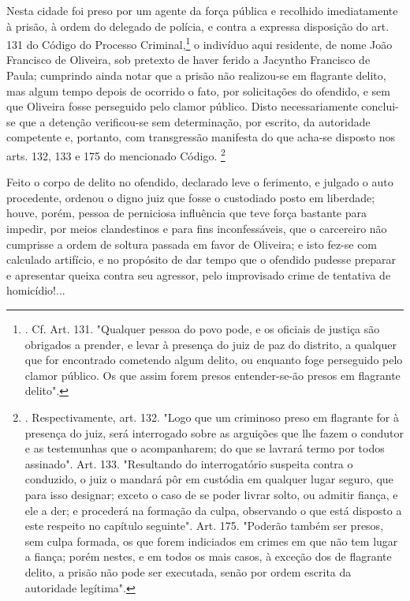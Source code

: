 Nesta cidade foi preso por um agente da força pública e recolhido
imediatamente à prisão, à ordem do delegado de polícia, e contra a
expressa disposição do art. 131 do Código do Processo
Criminal,\footnote{. Cf. Art. 131. "Qualquer pessoa do povo pode, e os
  oficiais de justiça são obrigados a prender, e levar à presença do
  juiz de paz do distrito, a qualquer que for encontrado cometendo algum
  delito, ou enquanto foge perseguido pelo clamor público. Os que assim
  forem presos entender-se-ão presos em flagrante delito".} o indivíduo
aqui residente, de nome João Francisco de Oliveira, sob pretexto de
haver ferido a Jacyntho Francisco de Paula; cumprindo ainda notar que a
prisão não realizou-se em flagrante delito, mas algum tempo depois de
ocorrido o fato, por solicitações do ofendido, e sem que Oliveira fosse
perseguido pelo clamor público. Disto necessariamente conclui-se que a
detenção verificou-se sem determinação, por escrito, da autoridade
competente e, portanto, com transgressão manifesta do que acha-se
disposto nos arts. 132, 133 e 175 do mencionado Código. \footnote{.
  Respectivamente, art. 132. "Logo que um criminoso preso em flagrante
  for à presença do juiz, será interrogado sobre as arguições que lhe
  fazem o condutor e as testemunhas que o acompanharem; do que se
  lavrará termo por todos assinado". Art. 133. "Resultando do
  interrogatório suspeita contra o conduzido, o juiz o mandará pôr em
  custódia em qualquer lugar seguro, que para isso designar; exceto o
  caso de se poder livrar solto, ou admitir fiança, e ele a der; e
  procederá na formação da culpa, observando o que está disposto a este
  respeito no capítulo seguinte". Art. 175. "Poderão também ser presos,
  sem culpa formada, os que forem indiciados em crimes em que não tem
  lugar a fiança; porém nestes, e em todos os mais casos, à exceção dos
  de flagrante delito, a prisão não pode ser executada, senão por ordem
  escrita da autoridade legítima".}

Feito o corpo de delito no ofendido, declarado leve o ferimento, e
julgado o auto procedente, ordenou o digno juiz que fosse o custodiado
posto em liberdade; houve, porém, pessoa de perniciosa influência que
teve força bastante para impedir, por meios clandestinos e para fins
inconfessáveis, que o carcereiro não cumprisse a ordem de soltura
passada em favor de Oliveira; e isto fez-se com calculado artifício, e
no propósito de dar tempo que o ofendido pudesse preparar e apresentar
queixa contra seu agressor, pelo improvisado crime de tentativa de
homicídio!...

